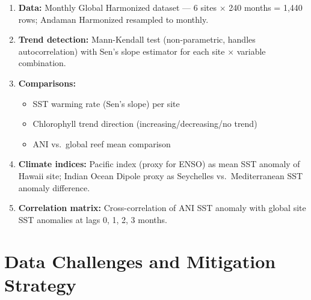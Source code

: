 \documentclass[12pt,a4paper]{report}
\begin{document}
\begin{enumerate}[leftmargin=*]
  \item \textbf{Data:} Monthly Global Harmonized dataset — 6 sites $\times$ 240 months
    = 1,440 rows; Andaman Harmonized resampled to monthly.
  \item \textbf{Trend detection:} Mann-Kendall test (non-parametric, handles
    autocorrelation) with Sen's slope estimator for each site $\times$ variable combination.
  \item \textbf{Comparisons:}
    \begin{itemize}
      \item SST warming rate (Sen's slope) per site
      \item Chlorophyll trend direction (increasing/decreasing/no trend)
      \item ANI vs.\ global reef mean comparison
    \end{itemize}
  \item \textbf{Climate indices:} Pacific index (proxy for ENSO) as mean SST anomaly of
    Hawaii site; Indian Ocean Dipole proxy as Seychelles vs.\ Mediterranean SST anomaly
    difference.
  \item \textbf{Correlation matrix:} Cross-correlation of ANI SST anomaly with global
    site SST anomalies at lags 0, 1, 2, 3 months.
\end{enumerate}

\chapter{Data Challenges and Mitigation Strategy}
\end{document}
